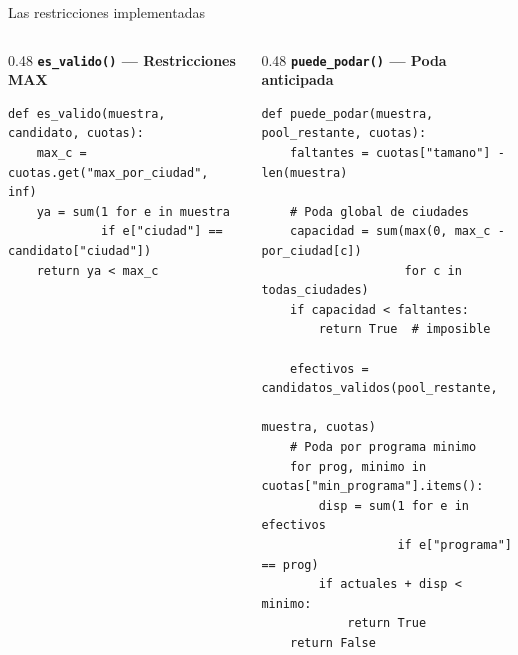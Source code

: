 \documentclass[aspectratio=169, 10pt]{beamer}
\begin{document}
\begin{frame}[fragile]{Las restricciones implementadas}
  \begin{columns}[T]
    \begin{column}{0.48\textwidth}
      \textbf{\texttt{es\_valido()} — Restricciones MAX}
      \lstset{style=python}
      \begin{lstlisting}
def es_valido(muestra, candidato, cuotas):
    max_c = cuotas.get("max_por_ciudad", inf)
    ya = sum(1 for e in muestra
             if e["ciudad"] == candidato["ciudad"])
    return ya < max_c
      \end{lstlisting}
    \end{column}
    \begin{column}{0.48\textwidth}
      \textbf{\texttt{puede\_podar()} — Poda anticipada}
      \lstset{style=python}
      \begin{lstlisting}
def puede_podar(muestra, pool_restante, cuotas):
    faltantes = cuotas["tamano"] - len(muestra)

    # Poda global de ciudades
    capacidad = sum(max(0, max_c - por_ciudad[c])
                    for c in todas_ciudades)
    if capacidad < faltantes:
        return True  # imposible

    efectivos = candidatos_validos(pool_restante,
                                   muestra, cuotas)
    # Poda por programa minimo
    for prog, minimo in cuotas["min_programa"].items():
        disp = sum(1 for e in efectivos
                   if e["programa"] == prog)
        if actuales + disp < minimo:
            return True
    return False
      \end{lstlisting}
    \end{column}
  \end{columns}
\end{frame}
\end{document}
